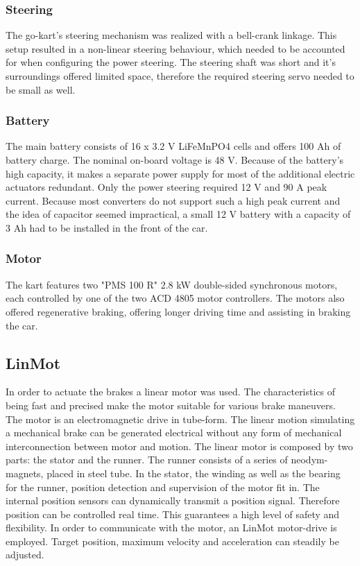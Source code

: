 \subsubsection{Steering}
The go-kart's steering mechanism was realized with a bell-crank linkage. This setup resulted in a non-linear steering behaviour, which needed to be accounted for when configuring the power steering. The steering shaft was short and it's surroundings offered limited space, therefore the required steering servo needed to be small as well.


\subsubsection{Battery}
The main battery consists of 16 x 3.2 V LiFeMnPO4 cells and offers 100 Ah of battery charge. The nominal on-board voltage is 48 V. Because of the battery's high capacity, it makes a separate power supply for most of the additional electric actuators redundant. Only the power steering required 12 V and 90 A peak current. Because most converters do not support such a high peak current and the idea of capacitor seemed impractical, a small 12 V battery with a capacity of 3 Ah had to be installed in the front of the car.

\subsubsection{Motor}
The kart features two "PMS 100 R" 2.8 kW double-sided synchronous motors, each controlled by one of the two ACD 4805 motor controllers. The motors also offered regenerative braking, offering longer driving time and assisting in braking the car.

\subsection{LinMot}
In order to actuate the brakes a linear motor was used. The characteristics of being fast and precised make the motor suitable for various brake maneuvers. The motor is an electromagnetic drive in tube-form. The linear motion simulating a mechanical brake can be generated electrical without any form of mechanical interconnection between motor and motion. The linear motor is composed by two parts: the stator and the runner. The runner consists of a series of neodym-magnets, placed in steel tube. In the stator, the winding as well as the bearing for the runner, position detection and supervision of the motor fit in.
The internal position sensors can dynamically transmit a position signal. Therefore position can be controlled real time. This guarantees a high level of safety and flexibility. 
In order to communicate with the motor, an LinMot motor-drive is employed. Target position, maximum velocity and acceleration can steadily be adjusted.


